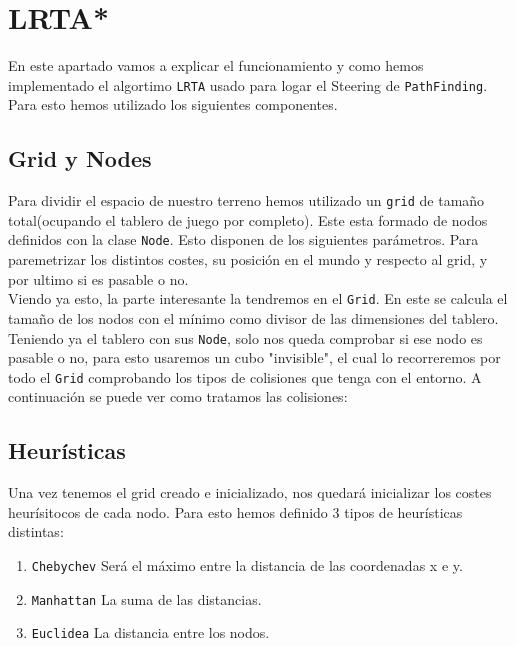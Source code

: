 
\section{LRTA*}

En este apartado vamos a explicar el funcionamiento y como hemos implementado el algortimo \texttt{LRTA} usado para logar el Steering de \texttt{PathFinding}. Para esto hemos utilizado los siguientes componentes. 

\subsection{Grid y Nodes}
Para dividir el espacio de nuestro terreno hemos utilizado un \texttt{grid} de tamaño total(ocupando el tablero de juego por completo). Este esta formado de nodos definidos con la clase \texttt{Node}. Esto disponen de los siguientes parámetros. Para paremetrizar los distintos costes, su posición en el mundo y respecto al grid, y por ultimo si es pasable o no.
\\


 
 Viendo ya esto, la parte interesante la tendremos en el \texttt{Grid}. En este se calcula el tamaño de los nodos con el mínimo como divisor de las dimensiones del tablero.\\
 Teniendo ya el tablero con sus \texttt{Node}, solo nos queda comprobar si ese nodo es pasable o no, para esto usaremos un cubo "invisible", el cual lo recorreremos por todo el \texttt{Grid} comprobando los tipos de colisiones que tenga con el entorno. A continuación se puede ver como tratamos las colisiones:\\
 
 
 
 \subsection{Heurísticas}
 Una vez tenemos el grid creado e inicializado, nos quedará inicializar los costes heurísitocos de cada nodo. Para esto hemos definido 3 tipos de heurísticas distintas:
 \begin{enumerate}
     \item\texttt{Chebychev} Será el máximo entre la distancia de las coordenadas x e y. 
     
     
     \item\texttt{Manhattan} La suma de las distancias.
     
     
      \item\texttt{Euclidea} La distancia entre los nodos.
     
     
 \end{enumerate}
 
